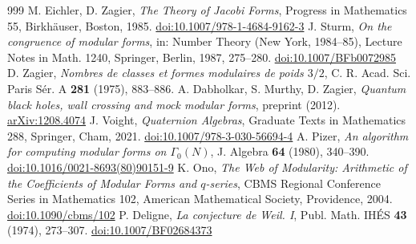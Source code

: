 \documentclass[11pt]{amsart}
\numberwithin{equation}{section}
\theoremstyle{plain}
\theoremstyle{remark}
\begin{document}
\begin{thebibliography}{999}
 M. Eichler, D. Zagier, \emph{The Theory of Jacobi Forms}, Progress in Mathematics 55, Birkh\"auser, Boston, 1985. \href{https://doi.org/10.1007/978-1-4684-9162-3}{doi:10.1007/978-1-4684-9162-3}
 J. Sturm, \emph{On the congruence of modular forms}, in: Number Theory (New York, 1984--85), Lecture Notes in Math. 1240, Springer, Berlin, 1987, 275--280. \href{https://doi.org/10.1007/BFb0072985}{doi:10.1007/BFb0072985}
 D. Zagier, \emph{Nombres de classes et formes modulaires de poids $3/2$}, C. R. Acad. Sci. Paris S\'er. A \textbf{281} (1975), 883--886.
 A. Dabholkar, S. Murthy, D. Zagier, \emph{Quantum black holes, wall crossing and mock modular forms}, preprint (2012). \href{https://arxiv.org/abs/1208.4074}{arXiv:1208.4074}
 J. Voight, \emph{Quaternion Algebras}, Graduate Texts in Mathematics 288, Springer, Cham, 2021. \href{https://doi.org/10.1007/978-3-030-56694-4}{doi:10.1007/978-3-030-56694-4}
 A. Pizer, \emph{An algorithm for computing modular forms on $\Gamma_0(N)$}, J. Algebra \textbf{64} (1980), 340--390. \href{https://doi.org/10.1016/0021-8693(80)90151-9}{doi:10.1016/0021-8693(80)90151-9}
 K. Ono, \emph{The Web of Modularity: Arithmetic of the Coefficients of Modular Forms and $q$-series}, CBMS Regional Conference Series in Mathematics 102, American Mathematical Society, Providence, 2004. \href{https://doi.org/10.1090/cbms/102}{doi:10.1090/cbms/102}
 P. Deligne, \emph{La conjecture de Weil. I}, Publ. Math. IH\'ES \textbf{43} (1974), 273--307. \href{https://doi.org/10.1007/BF02684373}{doi:10.1007/BF02684373}
\end{thebibliography}
\end{document}
